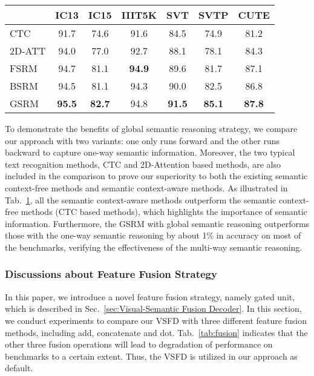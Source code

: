 \documentclass[10pt,twocolumn,letterpaper]{article}
\begin{document}
\begin{CJK}{UTF8}{gbsn}
\begin{table}[htp]
\begin{center}
{}
    \vspace{+1mm}
      \label{tab:global_superiority}
  \begin{tabular}{|l|c|c|c|c|c|c|}
         \hline
    &IC13&IC15&IIIT5K&SVT&SVTP&CUTE\\
  \hline
  CTC &91.7&74.6& 91.6& 84.5& 74.9& 81.2\\
2D-ATT& 94.0&77.0&92.7&88.1&78.1&84.3\\
FSRM& 94.7&81.1&\textbf{94.9}&89.6&81.7&87.1\\
BSRM& 94.5&81.1&94.3 & 90.0& 82.5& 86.8\\
GSRM& \textbf{95.5}&\textbf{82.7} &94.8 &\textbf{91.5} &\textbf{85.1} &\textbf{87.8}\\
  \hline
  \end{tabular}
  \end{center}
  \vspace{-8mm}
\end{table}

To demonstrate the benefits of global semantic reasoning strategy, we compare our approach with two variants: one only runs forward and the other runs backward to capture one-way semantic information. 
Moreover, the two typical text recognition methods, CTC and 2D-Attention based methods, are also included in the comparison to prove our superiority to both the existing semantic context-free methods and semantic context-aware methods. 
As illustrated in Tab.~\ref{tab:global_superiority}, all the semantic context-aware methods outperform the semantic context-free methods (CTC based methods), which highlights the importance of semantic information. Furthermore, the GSRM with global semantic reasoning outperforms those with the one-way semantic reasoning by about 1\% in accuracy on most of the benchmarks, verifying the effectiveness of the multi-way semantic reasoning.
\subsubsection{Discussions about Feature Fusion Strategy}
In this paper, we introduce a novel feature fusion strategy, namely gated unit, which is described in Sec.~\ref{sec:Visual-Semantic Fusion Decoder}. In this section, we conduct experiments to compare our VSFD with three different feature fusion methods, including add, concatenate and dot. Tab.~\ref{tab:fusion} indicates that the other three fusion operations will lead to degradation of performance on benchmarks to a certain extent. Thus, the VSFD is utilized in our approach as default.


\end{CJK}
\end{document}
